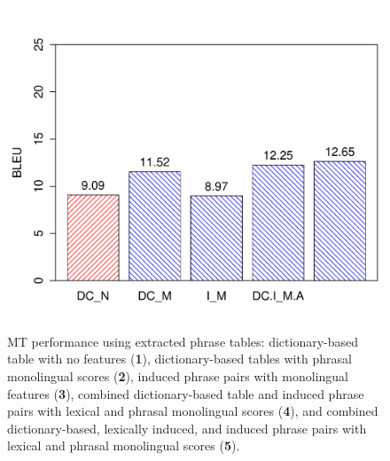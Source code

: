 \documentclass[11pt]{article}
\begin{document}
\begin{figure}[h]
\begin{center}
\includegraphics[width=\linewidth]{../figures/phrasetable/phrasetable.pdf}
\caption{MT performance using extracted phrase tables: dictionary-based table with no features ({\bf 1}), dictionary-based tables with phrasal monolingual scores ({\bf 2}), induced phrase pairs with monolingual features ({\bf 3}), combined dictionary-based table and induced phrase pairs with lexical and phrasal monolingual scores ({\bf 4}), and combined dictionary-based, lexically induced, and induced phrase pairs with lexical and phrasal monolingual scores ({\bf 5}). }
\label{fig:phrasetable}
\end{center}
\vskip -0.2in
\end{figure}


\end{document}
